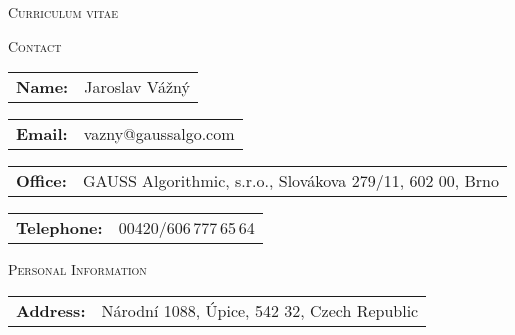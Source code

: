 \documentclass[10pt]{article}
\newlength{\oldcvlabelwidth}
\newlength{\oldcvlabelsep}
\begin{document}
\begin{cv}
\smallskip
\vspace{-1.2cm}
\begin{center}
 {\large \textsc{Curriculum vitae}\\ 
}\end{center}
 \vspace{-0.1 cm}

\setlength{\oldcvlabelwidth}{\cvlabelwidth}
\setlength{\oldcvlabelsep}{\cvlabelsep}

\setlength{\cvlabelwidth}{1em} 
\noindent\hrulefill
\begin{cvlist}{\large \textsc{Contact}}
\item \begin{tabular}{p{2cm}p{11cm}}  {\bf{Name:}} & Jaroslav Vážný\\
   \end{tabular}
 \item \begin{tabular}{p{2cm}p{11cm}}  
  {\bf{Email:}} & vazny@gaussalgo.com\\
   \end{tabular}
  \item \begin{tabular}{p{2cm}p{11cm}}
  {\bf{Office:}} & GAUSS Algorithmic, s.r.o.,  Slovákova 279/11, 602 00, Brno\\
   \end{tabular}
   \item \begin{tabular}{p{2cm}p{11cm}}
  {\bf{Telephone:}} & 00420/606\,777\,65\,64\\
   \end{tabular}
\end{cvlist}

\begin{cvlist}{\large \textsc{Personal Information}}
\item \begin{tabular}{p{4cm}p{11cm}}  {\bf{Address:}} & Národní 1088, Úpice, 542 32, Czech Republic \end{tabular}
\end{cvlist}


\end{cv}
\end{document}

